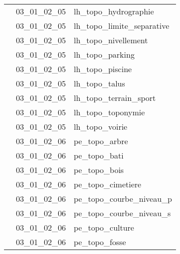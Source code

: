 \documentclass[12pt,titlepage]{book}
\begin{document}
\begin{supertabular}{|p{10cm}|c|p{15cm}|}
                    & 03\_01\_02\_05 & lh\_topo\_hydrographie\\


                    & 03\_01\_02\_05 & lh\_topo\_limite\_separative\\


                    & 03\_01\_02\_05 & lh\_topo\_nivellement\\


                    & 03\_01\_02\_05 & lh\_topo\_parking\\


                    & 03\_01\_02\_05 & lh\_topo\_piscine\\


                    & 03\_01\_02\_05 & lh\_topo\_talus\\


                    & 03\_01\_02\_05 & lh\_topo\_terrain\_sport\\


                    & 03\_01\_02\_05 & lh\_topo\_toponymie\\


                    & 03\_01\_02\_05 & lh\_topo\_voirie\\


                    & 03\_01\_02\_06 & pe\_topo\_arbre\\


                    & 03\_01\_02\_06 & pe\_topo\_bati\\


                    & 03\_01\_02\_06 & pe\_topo\_bois\\


                    & 03\_01\_02\_06 & pe\_topo\_cimetiere\\


                    & 03\_01\_02\_06 & pe\_topo\_courbe\_niveau\_p\\


                    & 03\_01\_02\_06 & pe\_topo\_courbe\_niveau\_s\\


                    & 03\_01\_02\_06 & pe\_topo\_culture\\


                    & 03\_01\_02\_06 & pe\_topo\_fosse\\



\end{supertabular}
\end{document}
